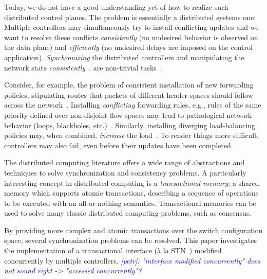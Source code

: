 \documentclass[conference]{sigcomm-alternate}
\newcommand{\petr}[1]{\textit{\textcolor{blue}{[petr]: #1}}} %
\begin{document}

Today, we do not have a good understanding yet of how to realize
such distributed control planes. The problem is essentially a
distributed systems
one: Multiple controllers may simultaneously try to
install conflicting updates and we want to resolve these conflicts
\emph{consistently} (no undesired behavior is observed on the data
plane) and \emph{efficiently} (no undesired delays are imposed on the
control application).
\emph{Synchronizing}
the distributed controllers and manipulating the network state \emph{consistently}~\cite{cpc}.
are non-trivial tasks~\cite{cap-theorem}.

Consider, for example, the problem of
consistent installation of new forwarding policies, stipulating routes
that packets of different header spaces should follow across the
network~\cite{network-update,roger-hotnets,correct,stn}.
Installing \emph{conflicting} forwarding rules, e.g., rules of the same priority defined over non-disjoint
flow spaces may lead to pathological network behavior (loops,
blackholes, etc.)~\cite{cpc}.
Similarly, installing diverging load-balancing policies may,
when combined, \emph{increase} the load~\cite{log-cent}.
To render things more difficult, controllers may also fail,
even before their updates have been completed.

The distributed computing literature offers
a wide range of abstractions
and techniques to solve synchronization and consistency problems.
A particularly interesting concept in distributed computing is a \emph{transactional memory}:
a shared memory which supports atomic transactions, describing a sequence of operations
to be executed with an all-or-nothing semantics. Transactional memories can be used to
 solve many
classic distributed computing problems, such as consensus.

By providing more complex and atomic transactions over the
switch configuration
space, several synchronization problems can be resolved.
This paper investigates the implementation of a transactional interface
(\`{a} la STN~\cite{stn}) modified concurrently by multiple controllers.
\petr{"interface modified concurrently" does not sound right -> "accessed concurrently"?}
\end{document}
